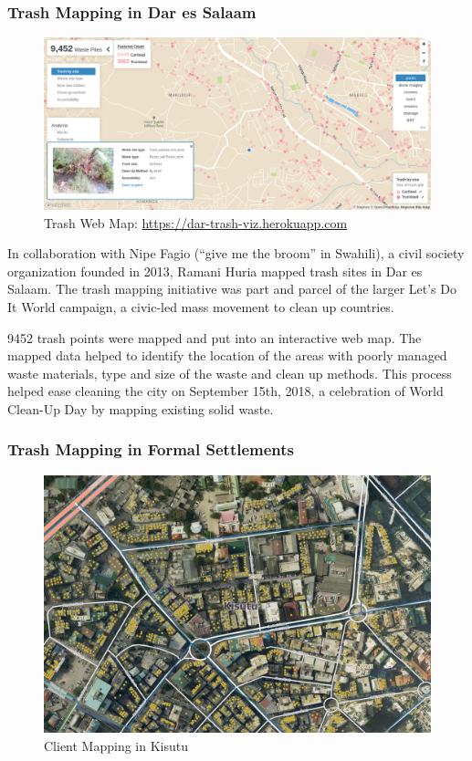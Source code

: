 \documentclass[a4paper,12pt,twoside]{article}
\begin{document}
\subsubsection{Trash Mapping in Dar es Salaam}
	\begin{figure}[h]
	\centering
	\includegraphics[width=.8\textwidth]{images/dar_trash.PNG}
	\caption{Trash Web Map: \href{https://dar-trash-viz.herokuapp.com}{https://dar-trash-viz.herokuapp.com}}
\end{figure}

\begin{multicols}{2}
In collaboration with Nipe Fagio (“give me the broom” in Swahili), a civil society organization founded in 2013, Ramani Huria mapped trash sites in Dar es Salaam. The trash mapping initiative was part and parcel of the larger Let’s Do It World campaign, a civic-led mass movement to clean up countries.

9452 trash points were mapped and put into an interactive web map. The mapped data helped to identify the location of the areas with poorly managed waste materials, type and size of the waste and clean up methods. This process helped ease cleaning the city on September 15th, 2018, a celebration of World Clean-Up Day by mapping existing solid waste.
\end{multicols}

\subsubsection{Trash Mapping in Formal Settlements}
\begin{figure}[h]
	\centering
	\includegraphics[width=.8\textwidth]{images/Trashmapsample.jpeg}
	\caption{Client Mapping in Kisutu}
\end{figure}
\end{document}
